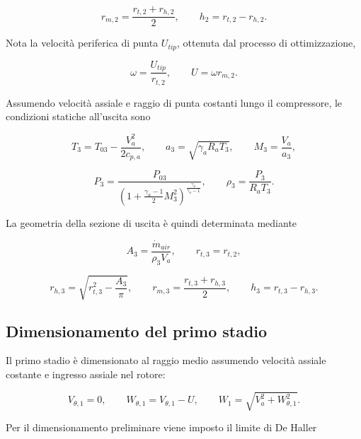 \begin{equation*}
r_{m,2}=\frac{r_{t,2}+r_{h,2}}{2},
\qquad
h_2=r_{t,2}-r_{h,2}.
\end{equation*}

Nota la velocità periferica di punta $U_{tip}$, ottenuta dal processo di
ottimizzazione,

\begin{equation*}
\omega=\frac{U_{tip}}{r_{t,2}},
\qquad
U=\omega r_{m,2}.
\end{equation*}

Assumendo velocità assiale e raggio di punta costanti lungo il
compressore, le condizioni statiche all'uscita sono

\begin{equation*}
T_3=T_{03}-\frac{V_a^2}{2c_{p,a}},
\qquad
a_3=\sqrt{\gamma_aR_aT_3},
\qquad
M_3=\frac{V_a}{a_3},
\end{equation*}

\begin{equation*}
P_3=
\frac{P_{03}}
{\left(1+\frac{\gamma_a-1}{2}M_3^2\right)^
{\frac{\gamma_a}{\gamma_a-1}}},
\qquad
\rho_3=\frac{P_3}{R_aT_3}.
\end{equation*}

La geometria della sezione di uscita è quindi determinata mediante

\begin{equation*}
A_3=\frac{\dot{m}_{air}}{\rho_3V_a},
\qquad
r_{t,3}=r_{t,2},
\end{equation*}

\begin{equation*}
r_{h,3}=
\sqrt{r_{t,3}^2-\frac{A_3}{\pi}},
\qquad
r_{m,3}=\frac{r_{t,3}+r_{h,3}}{2},
\qquad
h_3=r_{t,3}-r_{h,3}.
\end{equation*}


\subsection{Dimensionamento del primo stadio}

Il primo stadio è dimensionato al raggio medio assumendo velocità assiale
costante e ingresso assiale nel rotore:

\begin{equation*}
V_{\theta,1}=0,
\qquad
W_{\theta,1}=V_{\theta,1}-U,
\qquad
W_1=\sqrt{V_a^2+W_{\theta,1}^2}.
\end{equation*}

Per il dimensionamento preliminare viene imposto il limite di De Haller


